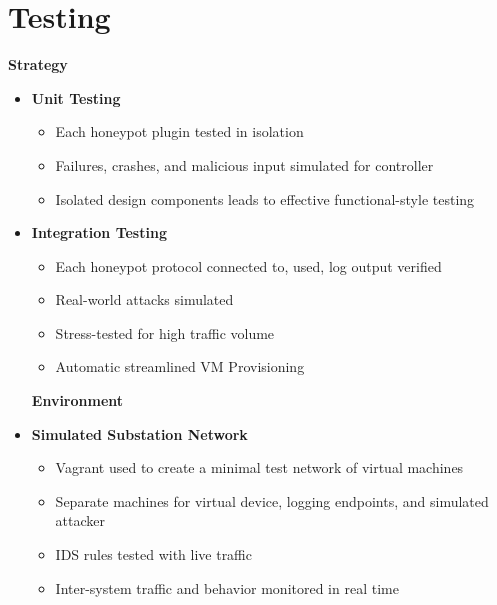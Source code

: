 \section*{\color{NavyBlue}Testing}

\large

\setlength{\columnsep}{2cm}

\begin{multicols}{2}
\begin{center}
\Large{\color{Blue}\textbf{Strategy}}
\end{center}
\vspace{1cm}

\begin{itemize}
\item[] \Large{\color{Black}\textbf{Unit Testing}}
\large
	\begin{itemize}
        \item Each honeypot plugin tested in isolation
        \item Failures, crashes, and malicious input simulated for controller
        \item Isolated design components leads to effective functional-style
        testing
	\end{itemize}
\item[] \Large{\color{Black}\textbf{Integration Testing}}
\large  
	\begin{itemize}     
	\item Each honeypot protocol connected to, used, log output verified
    \item Real-world attacks simulated
    \item Stress-tested for high traffic volume
    \item Automatic streamlined VM Provisioning
	\end{itemize}
\vfill
\columnbreak

\begin{center}
\Large{\color{Blue}\textbf{Environment}}
\end{center}
\vspace{1cm}

\item[] \Large{\color{Black}\textbf{Simulated Substation Network}}
\large
	\begin{itemize}
        \item Vagrant used to create a minimal test network of virtual machines
        \item Separate machines for virtual device, logging endpoints, and
        simulated attacker
        \item IDS rules tested with live traffic
        \item Inter-system traffic and behavior monitored in real time
	\end{itemize}
\end{itemize}


\end{multicols}
